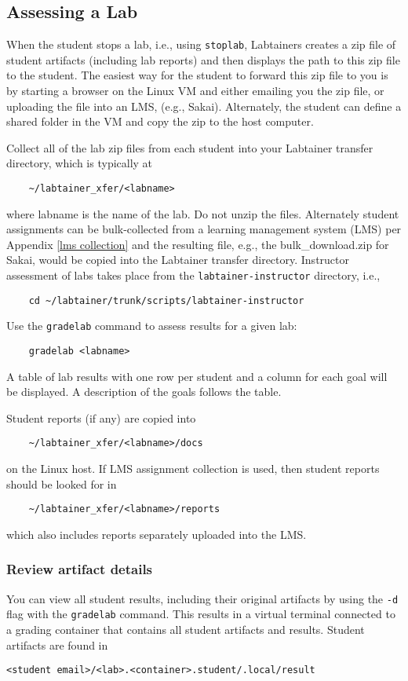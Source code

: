 \documentclass[12pt]{article}
\begin{document}
\subsection{Assessing a Lab}
When the student stops a lab, i.e., using {\tt stoplab}, Labtainers creates a zip file of
student artifacts (including lab reports) and then displays the path to this zip file to
the student.  The easiest way for the student to forward this zip file to you is by starting
a browser on the Linux VM and either emailing you the zip file, or uploading the file
into an LMS, (e.g., Sakai).  Alternately, the student can define a shared folder in the VM
and copy the zip to the host computer.

Collect all of the lab zip files from each student into your Labtainer transfer directory, which
is typically at
\begin{verbatim}
    ~/labtainer_xfer/<labname>
\end{verbatim}
\noindent where labname is the name of the lab.  Do not unzip the files.  Alternately student
assignments can be bulk-collected from a learning management system (LMS) per Appendix \ref{lms collection}
and the resulting file, e.g., the bulk\_download.zip for Sakai, would be copied into the
Labtainer transfer directory.
Instructor assessment of labs takes place from the {\tt labtainer-instructor} directory, i.e.,
\begin{verbatim}
    cd ~/labtainer/trunk/scripts/labtainer-instructor
\end{verbatim}

\noindent Use the {\tt gradelab} command to assess results for a given lab:
\begin{verbatim}
    gradelab <labname>
\end{verbatim}
\noindent A table of lab results with one row per student and
a column for each goal will be displayed.  A description of the goals follows the table.

Student reports (if any) are  copied into 
\begin{verbatim}
    ~/labtainer_xfer/<labname>/docs
\end{verbatim}
\noindent on the Linux host.  If LMS assignment collection is used, then student reports should
be looked for in 
\begin{verbatim}
    ~/labtainer_xfer/<labname>/reports
\end{verbatim}
\noindent which also includes reports separately uploaded into the LMS.

\subsubsection{Review artifact details}
You can view all student results, including their original artifacts by using the {\tt -d} flag
with the {\tt gradelab} command.  This results in a virtual terminal connected to a grading
container that contains all student artifacts and results.  Student artifacts are found in 
\begin{verbatim}
<student email>/<lab>.<container>.student/.local/result
\end{verbatim}
\end{document}

